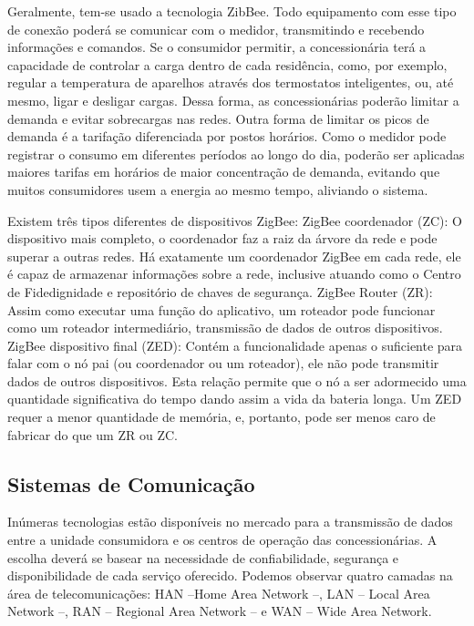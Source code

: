 	Geralmente, tem-se usado a tecnologia ZibBee. Todo equipamento com esse tipo de conexão poderá se comunicar com o medidor, transmitindo e recebendo informações e comandos. Se o consumidor permitir, a concessionária terá a capacidade de controlar a carga dentro de cada residência, como, por exemplo, regular a temperatura de aparelhos através dos termostatos inteligentes, ou, até mesmo, ligar e desligar cargas. Dessa forma, as concessionárias poderão limitar a demanda e evitar sobrecargas nas redes. Outra forma de limitar os picos de demanda é a tarifação diferenciada por postos horários. Como o medidor pode registrar o consumo em diferentes períodos ao longo do dia, poderão ser aplicadas maiores tarifas em horários de maior concentração de demanda, evitando que muitos consumidores usem a energia ao mesmo tempo, aliviando o sistema\cite{2015Zimmermann}.

	Existem três tipos diferentes de dispositivos ZigBee: ZigBee coordenador (ZC): O dispositivo mais completo, o coordenador faz a raiz da árvore da rede e pode superar a outras redes. Há exatamente um coordenador ZigBee em cada rede, ele é capaz de armazenar informações sobre a rede, inclusive atuando como o Centro de Fidedignidade e repositório de chaves de segurança. ZigBee Router (ZR): Assim como executar uma função do aplicativo, um roteador pode funcionar como um roteador intermediário, transmissão de dados de outros dispositivos. ZigBee dispositivo final (ZED): Contém a funcionalidade apenas o suficiente para falar com o nó pai (ou coordenador ou um roteador), ele não pode transmitir dados de outros dispositivos. Esta relação permite que o nó a ser adormecido uma quantidade significativa do tempo dando assim a vida da bateria longa. Um ZED requer a menor quantidade de memória, e, portanto, pode ser menos caro de fabricar do que um ZR ou ZC.

\subsection{Sistemas de Comunicação}

	Inúmeras tecnologias estão disponíveis no mercado para a transmissão de dados entre a unidade consumidora e os centros de operação das concessionárias. A escolha deverá se basear na necessidade de confiabilidade, segurança e disponibilidade de cada serviço oferecido. Podemos observar quatro camadas na área de telecomunicações: HAN –Home Area Network –, LAN – Local Area Network –, RAN – Regional Area Network – e WAN – Wide Area Network.

